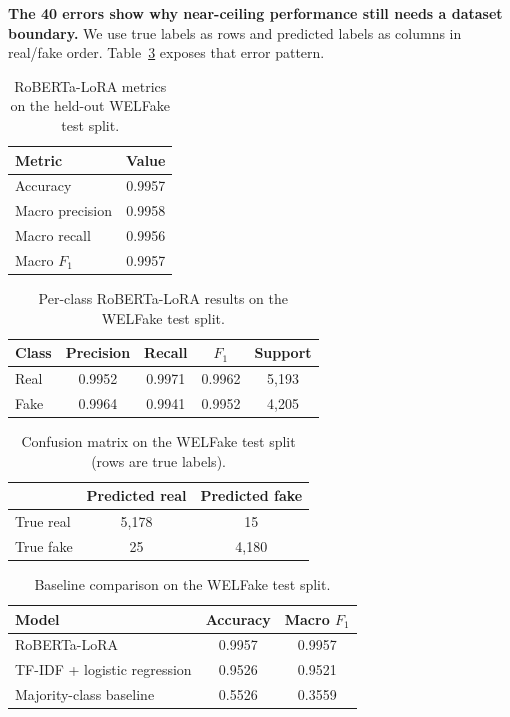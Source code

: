 \documentclass[10pt,twocolumn,letterpaper]{article}
\begin{document}
\textbf{The 40 errors show why near-ceiling performance still needs a dataset
boundary.} We use true labels as rows and predicted labels as columns in real/fake
order. Table~\ref{tab:confusion} exposes that error pattern.

\begin{table}
\begin{center}
\begin{tabular}{|l|c|}
\hline
Metric & Value \\
\hline\hline
Accuracy & 0.9957 \\
Macro precision & 0.9958 \\
Macro recall & 0.9956 \\
Macro $F_1$ & 0.9957 \\
\hline
\end{tabular}
\end{center}
\caption{RoBERTa-LoRA metrics on the held-out WELFake test split.}
\label{tab:classifier-metrics}
\end{table}

\begin{table}
\begin{center}
\begin{tabular}{|l|c|c|c|c|}
\hline
Class & Precision & Recall & $F_1$ & Support \\
\hline\hline
Real & 0.9952 & 0.9971 & 0.9962 & 5{,}193 \\
Fake & 0.9964 & 0.9941 & 0.9952 & 4{,}205 \\
\hline
\end{tabular}
\end{center}
\caption{Per-class RoBERTa-LoRA results on the WELFake test split.}
\label{tab:perclass}
\end{table}

\begin{table}
\begin{center}
\begin{tabular}{|l|c|c|}
\hline
 & Predicted real & Predicted fake \\
\hline\hline
True real & 5{,}178 & 15 \\
True fake & 25 & 4{,}180 \\
\hline
\end{tabular}
\end{center}
\caption{Confusion matrix on the WELFake test split (rows are true labels).}
\label{tab:confusion}
\end{table}

\begin{table}
\begin{center}
\small
\begin{tabular}{|l|c|c|}
\hline
Model & Accuracy & Macro $F_1$ \\
\hline\hline
RoBERTa-LoRA & 0.9957 & 0.9957 \\
TF-IDF + logistic regression & 0.9526 & 0.9521 \\
Majority-class baseline & 0.5526 & 0.3559 \\
\hline
\end{tabular}
\end{center}
\caption{Baseline comparison on the WELFake test split.}
\label{tab:baselines}
\end{table}
\end{document}
